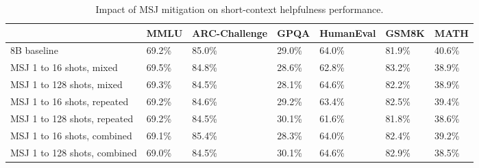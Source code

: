 \begin{table}[]
\begin{tabular}{@{}lllllll@{}}
\toprule
                                      & MMLU   & ARC-Challenge & GPQA   & HumanEval & GSM8K  & MATH   \\ \midrule
8B baseline & 69.2\% & 85.0\%        & 29.0\% & 64.0\%    & 81.9\% & 40.6\% \\
MSJ 1 to 16 shots, mixed              & 69.5\% & 84.8\%        & 28.6\% & 62.8\%    & 83.2\% & 38.9\% \\
MSJ 1 to 128 shots, mixed             & 69.3\% & 84.5\%        & 28.1\% & 64.6\%    & 82.2\% & 38.9\% \\
MSJ 1 to 16 shots, repeated           & 69.2\% & 84.6\%        & 29.2\% & 63.4\%    & 82.5\% & 39.4\% \\
MSJ 1 to 128 shots, repeated          & 69.2\% & 84.5\%        & 30.1\% & 61.6\%    & 81.8\% & 38.6\% \\
MSJ 1 to 16 shots, combined           & 69.1\% & 85.4\%        & 28.3\% & 64.0\%    & 82.4\% & 39.2\% \\
MSJ 1 to 128 shots, combined          & 69.0\% & 84.5\%        & 30.1\% & 64.6\%    & 82.9\% & 38.5\% \\ \bottomrule
\end{tabular}
\caption{Impact of MSJ mitigation on short-context helpfulness performance. \label{table:msj-sc-helpfulness}}
\end{table}

